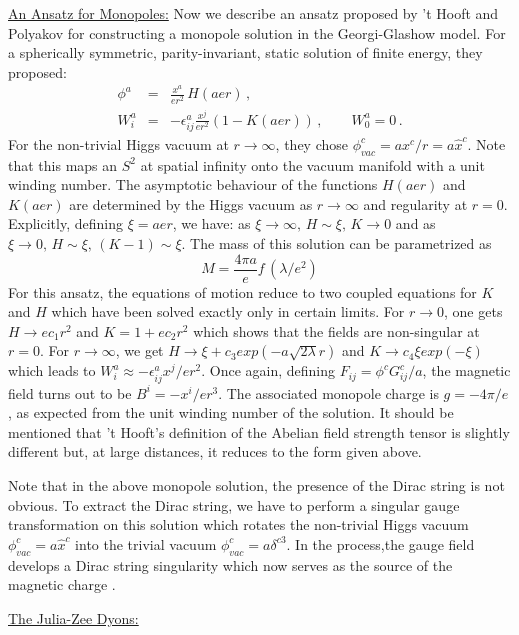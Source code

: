\noindent\underline{An Ansatz for Monopoles:}
\noindent Now we describe an ansatz proposed by 't Hooft \cite{thooft}
and Polyakov \cite{polya} for constructing a monopole solution in the 
Georgi-Glashow model. For a spherically symmetric, parity-invariant,
static solution of finite energy, they proposed:
\begin{eqnarray}
\phi^a & = & \frac{x^a}{er^2}\,H(aer)\,,\nonumber\\
W^a_i&=&-\epsilon^a_{ij}\frac{x^j}{er^2}\left(1 - K(aer)\right)\,,
\qquad W^a_0= 0\,.
\label{tp-ansatz}
\end{eqnarray}
For the non-trivial Higgs vacuum at $r\rightarrow\infty$, they chose
$\phi^c_{vac}=ax^c/r= a\hat{x}^c$. Note that this maps an $S^2$ at
spatial infinity onto the vacuum manifold with a unit winding number.
The asymptotic behaviour of the functions $H(aer)$ and $K(aer)$ are
determined by the Higgs vacuum as $r\rightarrow\infty$ and regularity
at $r=0$. Explicitly, defining $\xi=aer$, we have: as
$\xi\rightarrow\infty,\,H\sim\xi,\, K\rightarrow 0$ and as
$\xi\rightarrow 0,\, H\sim\xi,\,(K-1)\sim\xi$. The mass of this
solution can be parametrized as
$$
M = \frac{4 \pi a}{e} f \, (\lambda /e^{2})
$$
For this ansatz, the equations of motion reduce to two coupled
equations for $K$ and $H$ which have been solved exactly only in
certain limits.  
For $r\rightarrow 0$, one gets $H\rightarrow ec_1 r^2$ and
$K=1+ec_2r^2$ which shows that the fields are non-singular at
$r=0$. For $r\rightarrow\infty$, we get $H\rightarrow\xi+c_3
exp(-a\sqrt{2\lambda}r)$ and $K\rightarrow c_4\xi exp(-\xi)$ which
leads to $W^a_i\approx-\epsilon^a_{ij}x^j/er^2$. Once again, defining
$F_{ij}=\phi^c G^c_{ij}/a$, the magnetic field turns out to be  
$B^{i} = - x^i/e r^3$. The associated monopole charge is $g=-4\pi/e$,
as expected from the unit winding number of the solution. It should be
mentioned that 't Hooft's definition of the Abelian field strength
tensor is slightly different but, at large distances, it reduces to
the form given above. 

Note that in the above monopole solution, the presence of the Dirac
string is not obvious. To extract the Dirac string, we have to perform
a singular gauge transformation on this solution which rotates the
non-trivial Higgs vacuum $\phi^c_{vac}=a\hat{x}^c$ into the trivial
vacuum $\phi^c_{vac}= a \delta^{c3}$. In the process,the gauge field
develops a Dirac string singularity which now serves as the source of
the magnetic charge \cite{thooft}.  

\noindent\underline{The Julia-Zee Dyons:}


